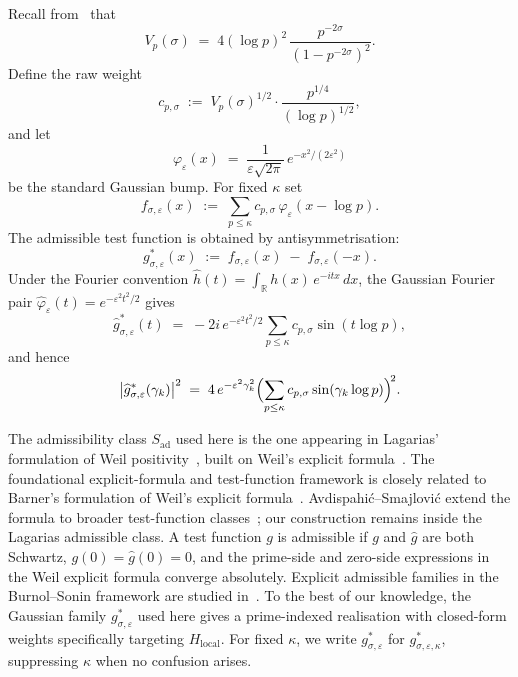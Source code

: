 \documentclass[11pt]{article}
\newcommand{\Hlocal}{H_{\mathrm{local}}}
\newcommand{\Sad}{S_{\mathrm{ad}}}
\begin{document}
Recall from~\cite[\S\,2, finite-place contribution]{Paper1} that
\[
V_p(\sigma)
\;=\; 4(\log p)^2\,\frac{p^{-2\sigma}}{(1-p^{-2\sigma})^2}.
\]
Define the raw weight
\[
c_{p,\sigma}
\;:=\; V_p(\sigma)^{1/2}
\cdot \frac{p^{1/4}}{(\log p)^{1/2}},
\]
and let
\[
\varphi_\varepsilon(x)
\;=\; \frac{1}{\varepsilon\sqrt{2\pi}}\,e^{-x^2/(2\varepsilon^2)}
\]
be the standard Gaussian bump.
For fixed $\kappa$ set
\[
f_{\sigma,\varepsilon}(x)
\;:=\; \sum_{p\le\kappa} c_{p,\sigma}\,
       \varphi_\varepsilon(x-\log p).
\]
The admissible test function is obtained by antisymmetrisation:
\begin{equation}\label{eq:gstar}
g^*_{\sigma,\varepsilon}(x)
\;:=\; f_{\sigma,\varepsilon}(x)
       \;-\; f_{\sigma,\varepsilon}(-x).
\end{equation}
Under the Fourier convention
$\widehat h(t) = \int_{\mathbb R} h(x)\,e^{-itx}\,dx$,
the Gaussian Fourier pair
$\widehat\varphi_\varepsilon(t)=e^{-\varepsilon^2 t^2/2}$
gives
\begin{equation}\label{eq:FT-gstar}
\widehat g^*_{\sigma,\varepsilon}(t)
\;=\; -2i\,e^{-\varepsilon^2 t^2/2}
\sum_{p\le\kappa} c_{p,\sigma}\sin(t\log p),
\end{equation}
and hence
\begin{equation}\label{eq:gstar-modsq}
\bigl|\widehat g^*_{\sigma,\varepsilon}(\gamma_k)\bigr|^2
\;=\; 4\,e^{-\varepsilon^2\gamma_k^2}
\Bigl(\sum_{p\le\kappa}
c_{p,\sigma}\sin(\gamma_k\log p)\Bigr)^{\!2}.
\end{equation}

The admissibility class $\Sad$ used here is the one appearing in
Lagarias' formulation of Weil positivity~\cite{Lagarias}, built
on Weil's explicit formula~\cite{Weil}.
The foundational explicit-formula and test-function framework
is closely related to Barner's formulation of Weil's explicit
formula~\cite{Barner81}.
Avdispahi\'c--Smajlovi\'c extend the formula to broader
test-function classes~\cite{AvdSmaj05}; our construction remains
inside the Lagarias admissible class.
A test function $g$ is
admissible if $g$ and $\widehat g$ are both Schwartz,
$g(0)=\widehat g(0)=0$, and the prime-side and zero-side
expressions in the Weil explicit formula converge absolutely.
Explicit admissible families in the Burnol--Sonin
framework are studied in~\cite{Burnol,BurnolJTNB}.
To the best of our knowledge,
the Gaussian family $g^*_{\sigma,\varepsilon}$ used here gives a
prime-indexed realisation with closed-form weights specifically
targeting $\Hlocal$.
For fixed $\kappa$, we write $g^*_{\sigma,\varepsilon}$ for
$g^*_{\sigma,\varepsilon,\kappa}$, suppressing $\kappa$ when
no confusion arises.
\end{document}

